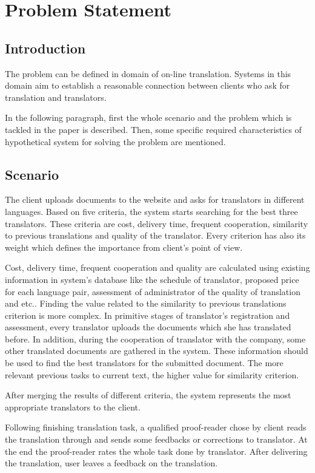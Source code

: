 \section{Problem Statement}
\subsection{Introduction}
The problem can be defined in domain of on-line translation. Systems in this domain aim to establish a reasonable connection between clients who ask for translation and translators.

In the following paragraph, first the whole scenario and the problem which is tackled in the paper is described. Then, some specific required characteristics of hypothetical system for solving the problem are mentioned.

\subsection{Scenario}
The client uploads documents to the website and asks for translators in different languages. Based on five criteria, the system starts searching for the best three translators. These criteria are cost, delivery time, frequent cooperation, similarity to previous translations and quality of the translator. Every criterion has also its weight which defines the importance from client's point of view.

Cost, delivery time, frequent cooperation and quality are calculated using existing information in system's database like the schedule of translator, proposed price for each language pair, assessment of administrator of the quality of translation and etc.. Finding the value related to the similarity to previous translations criterion is more complex. In primitive stages of translator's registration and assessment, every translator uploads the documents which she has translated before. In addition, during the cooperation of translator with the company, some other translated documents are gathered in the system. These information should be used to find the best translators for the submitted document. The more relevant previous tasks to current text, the higher value for similarity criterion.

After merging the results of different criteria, the system represents the most appropriate translators to the client.

Following finishing translation task, a qualified proof-reader chose by client reads the translation through and sends some feedbacks or corrections to translator. At the end the proof-reader rates the whole task done by translator. After delivering the translation, user leaves a feedback on the translation.


